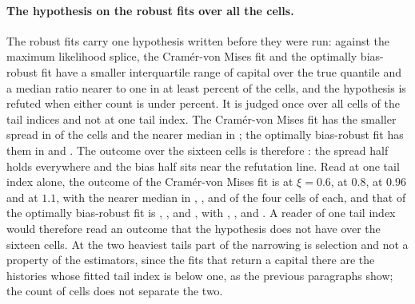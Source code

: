 

\paragraph{The hypothesis on the robust fits over all the cells.} The robust fits carry one hypothesis written before they were run: against the maximum likelihood splice, the Cram\'er-von Mises fit and the optimally bias-robust fit have a smaller interquartile range of capital over the true quantile and a median ratio nearer to one in at least \opSThreeHolds{} percent of the cells, and the hypothesis is refuted when either count is under \opSThreeRefuted{} percent. It is judged once over all \opSThreeCells{} cells of the \opSThreeVariants{} tail indices and not at one tail index. The Cram\'er-von Mises fit has the smaller spread in \opSThreeSpreadCvm{} of the \opSThreeCells{} cells and the nearer median in \opSThreeBiasCvm{}; the optimally bias-robust fit has them in \opSThreeSpreadObre{} and \opSThreeBiasObre{}. The outcome over the sixteen cells is therefore \opSThreeVerdict{}: the spread half holds everywhere and the bias half sits near the refutation line. Read at one tail index alone, the outcome of the Cram\'er-von Mises fit is \opSThreeVerdictCvmA{} at $\xi=0.6$, \opSThreeVerdictCvmB{} at $0.8$, \opSThreeVerdictCvmC{} at $0.96$ and \opSThreeVerdictCvmD{} at $1.1$, with the nearer median in \opSThreeBiasCvmA{}, \opSThreeBiasCvmB{}, \opSThreeBiasCvmC{} and \opSThreeBiasCvmD{} of the four cells of each, and that of the optimally bias-robust fit is \opSThreeVerdictObreA{}, \opSThreeVerdictObreB{}, \opSThreeVerdictObreC{} and \opSThreeVerdictObreD{}, with \opSThreeBiasObreA{}, \opSThreeBiasObreB{}, \opSThreeBiasObreC{} and \opSThreeBiasObreD{}. A reader of one tail index would therefore read an outcome that the hypothesis does not have over the sixteen cells. At the two heaviest tails part of the narrowing is selection and not a property of the estimators, since the fits that return a capital there are the histories whose fitted tail index is below one, as the previous paragraphs show; the count of cells does not separate the two.

